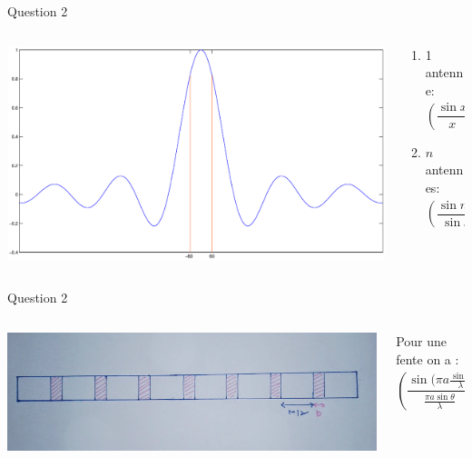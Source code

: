 \documentclass{beamer}
\begin{document}
\begin{frame}{Question 2}
	\begin{columns}
		\begin{column}{0.60\textwidth}
			\begin{center}
	    		\includegraphics[scale=0.21]{sinxx.eps}
        		\end{center}
        	\end{column}
        	\begin{column}{0.35\textwidth}
			\begin{center}
	    \begin{enumerate}
	    \item 1 antenne:$$ \left( \frac{\sin x}{x}\right)^2$$
	    \item $n$ antennes: $$ \left( \frac{\sin nx}{\sin x}\right)^2 \cdot \left( \frac{\sin x}{x}\right)$$
	    \end{enumerate}
	    
        	\end{center}
        	\end{column}
        	\end{columns}
\end{frame}
\begin{frame}{Question 2}
	\begin{columns}
		\begin{column}{0.40\textwidth}
			\begin{center}
	    		\includegraphics[scale=0.25, angle=90]{Question2.png}
        		\end{center}
        	\end{column}
        	\begin{column}{0.40\textwidth}
			\begin{center}
	    Pour une fente on a :
	    $$\left( \frac{\sin (\pi a \frac{\sin \theta}{\lambda}}{\frac{\pi a \sin \theta}{\lambda}}\right)^2=\frac{1}{2}$$
	    
        	\end{center}
        	\end{column}
        	\end{columns}
\end{frame}
\end{document}
